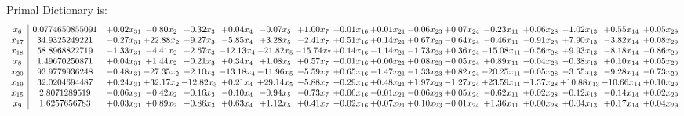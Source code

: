 \documentclass[9pt]{article}
\begin{document}
Primal Dictionary is:
\[\begin{array}{c| c c@{\hskip 2pt} c@{\hskip 2pt} c@{\hskip 2pt} c@{\hskip 2pt} c@{\hskip 2pt} c@{\hskip 2pt} c@{\hskip 2pt} c@{\hskip 2pt} c@{\hskip 2pt} c@{\hskip 2pt} c@{\hskip 2pt} c@{\hskip 2pt} c@{\hskip 2pt} c@{\hskip 2pt} c@{\hskip 2pt} }
 x_{6}   &  0.0774650855091 & +  0.02 x_{31} & -0.80 x_{2} & +  0.32 x_{3} & +  0.04 x_{4} & -0.07 x_{5} & +  1.00 x_{7} & -0.01 x_{16} & +  0.01 x_{21} & -0.06 x_{23} & +  0.07 x_{24} & -0.23 x_{11} & +  0.06 x_{28} & -1.02 x_{13} & +  0.55 x_{14} & +  0.05 x_{29}\\
 x_{17}   &  34.9325249221 & -0.27 x_{31} & + 22.88 x_{2} & -9.27 x_{3} & -5.85 x_{4} & +  3.28 x_{5} & -2.41 x_{7} & +  0.51 x_{16} & +  0.14 x_{21} & +  0.67 x_{23} & -0.64 x_{24} & -0.46 x_{11} & -0.91 x_{28} & +  7.90 x_{13} & -3.82 x_{14} & +  0.08 x_{29}\\
 x_{18}   &  58.8968822719 & -1.33 x_{31} & -4.41 x_{2} & +  2.67 x_{3} & -12.13 x_{4} & -21.82 x_{5} & -15.74 x_{7} & +  0.14 x_{16} & -1.14 x_{21} & -1.73 x_{23} & +  0.36 x_{24} & -15.08 x_{11} & -0.56 x_{28} & +  9.93 x_{13} & -8.18 x_{14} & -0.86 x_{29}\\
 x_{8}   &  1.49670250871 & +  0.04 x_{31} & +  1.44 x_{2} & -0.21 x_{3} & +  0.34 x_{4} & +  1.08 x_{5} & +  0.57 x_{7} & -0.01 x_{16} & +  0.06 x_{21} & +  0.08 x_{23} & -0.05 x_{24} & +  0.89 x_{11} & -0.04 x_{28} & -0.38 x_{13} & +  0.10 x_{14} & +  0.05 x_{29}\\
 x_{20}   &  93.9779936248 & -0.48 x_{31} & -27.35 x_{2} & +  2.10 x_{3} & -13.18 x_{4} & -11.96 x_{5} & -5.59 x_{7} & +  0.65 x_{16} & -1.47 x_{21} & -1.33 x_{23} & +  0.82 x_{24} & -20.25 x_{11} & -0.05 x_{28} & -3.55 x_{13} & -9.28 x_{14} & -0.73 x_{29}\\
 x_{19}   &  32.0204694487 & +  0.24 x_{31} & + 32.17 x_{2} & -12.82 x_{3} & +  0.21 x_{4} & + 29.14 x_{5} & -5.88 x_{7} & -0.29 x_{16} & +  0.48 x_{21} & +  1.97 x_{23} & -1.27 x_{24} & + 23.59 x_{11} & -1.37 x_{28} & + 10.88 x_{13} & -10.66 x_{14} & +  0.10 x_{29}\\
 x_{15}   &  2.8071289519 & -0.06 x_{31} & -0.42 x_{2} & +  0.16 x_{3} & -0.10 x_{4} & -0.94 x_{5} & -0.73 x_{7} & +  0.06 x_{16} & -0.01 x_{21} & -0.06 x_{23} & +  0.05 x_{24} & -0.62 x_{11} & +  0.02 x_{28} & -0.12 x_{13} & -0.14 x_{14} & +  0.02 x_{29}\\
 x_{9}   &  1.6257656783 & +  0.03 x_{31} & +  0.89 x_{2} & -0.86 x_{3} & +  0.63 x_{4} & +  1.12 x_{5} & +  0.41 x_{7} & -0.02 x_{16} & +  0.07 x_{21} & +  0.10 x_{23} & -0.01 x_{24} & +  1.36 x_{11} & +  0.00 x_{28} & +  0.04 x_{13} & +  0.17 x_{14} & +  0.04 x_{29}\\

\end{array}\]
\end{document}
